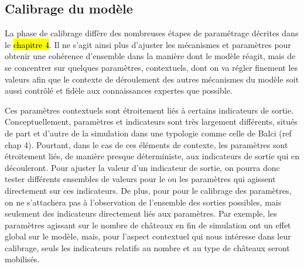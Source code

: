 %
%
%


\subsection{Calibrage du modèle \label{subsec:calibrage}}

La phase de calibrage diffère des nombreuses étapes de paramétrage décrites dans le \hl{chapitre 4}.
Il  ne s'agit ainsi plus d'ajuster les mécanismes et paramètres pour obtenir une cohérence d'ensemble dans la manière dont le modèle réagit, mais de se concentrer sur quelques paramètres, contextuels, dont on va régler finement les valeurs afin que le contexte de déroulement des autres mécanismes du modèle soit aussi contrôlé et fidèle aux connaissances expertes que possible.

Ces paramètres contextuels sont étroitement liés à certains indicateurs de sortie.
Conceptuellement, paramètres et indicateurs sont très largement différents, situés de part et d'autre de la simulation dans une typologie comme celle de Balci (ref chap 4).
Pourtant, dans le cas de ces éléments de contexte, les paramètres sont étroitement liés, de manière presque déterministe, aux indicateurs de sortie qui en découleront.
Pour \og ajuster\fg{} la valeur d'un indicateur de sortie, on pourra donc tester différents ensembles de valeurs pour le ou les paramètres qui agissent directement sur ces indicateurs.
De plus, pour pour le calibrage des paramètres, on ne s'attachera pas à l'observation de l'ensemble des sorties possibles, mais seulement des indicateurs directement liés aux paramètres.
Par exemple, les paramètres agissant sur le nombre de châteaux en fin de simulation ont un effet global sur le modèle, mais, pour l'aspect contextuel qui nous intéresse dans leur calibrage, seuls les indicateurs relatifs au nombre et au type de châteaux seront mobilisés.

